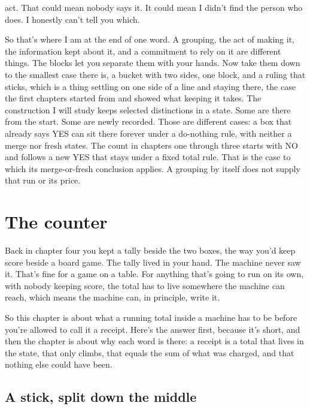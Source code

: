 \documentclass[11pt,twoside]{article}
\theoremstyle{thielethm}
\theoremstyle{thieledef}
\theoremstyle{thieledef}
\theoremstyle{thieledef}
\theoremstyle{thielethm}
\theoremstyle{thieleobs}
\theoremstyle{thielethm}
\begin{document}
act. That could mean nobody says it. It could mean I didn't find the person who does. I honestly can't tell you which.

So that's where I am at the end of one word. A grouping, the act of making it, the information kept about it, and a commitment to rely on it are different things. The blocks let you separate them with your hands. Now take them down to the smallest case there is, a bucket with two sides, one block, and a ruling that sticks, which is a thing settling on one side of a line and staying there, the case the first chapters started from and showed what keeping it takes. The construction I will study keeps selected distinctions in a state. Some are there from the start. Some are newly recorded. Those are different cases: a box that already says YES can sit there forever under a do-nothing rule, with neither a merge nor fresh states. The count in chapters one through three starts with NO and follows a new YES that stays under a fixed total rule. That is the case to which its merge-or-fresh conclusion applies. A grouping by itself does not supply that run or its price.

\section{The counter}
\label{sec:counter}

Back in chapter four you kept a tally beside the two boxes, the way you'd keep score beside a board game. The tally lived in your hand. The machine never saw it. That's fine for a game on a table. For anything that's going to run on its own, with nobody keeping score, the total has to live somewhere the machine can reach, which means the machine can, in principle, write it.

So this chapter is about what a running total inside a machine has to be before you're allowed to call it a receipt. Here's the answer first, because it's short, and then the chapter is about why each word is there: a receipt is a total that lives in the state, that only climbs, that equals the sum of what was charged, and that nothing else could have been.

\subsection{A stick, split down the middle}
\end{document}
